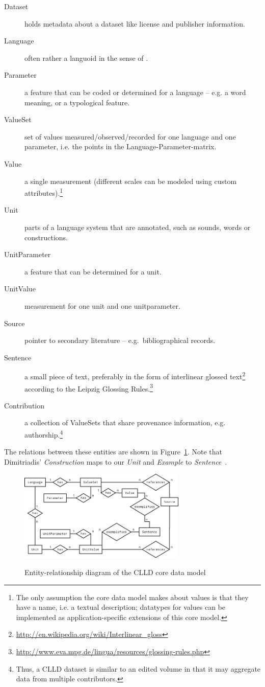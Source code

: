 \documentclass[a4paper,10pt]{article}
\begin{document}
\begin{description}
\item[Dataset] holds metadata about a dataset like license and publisher information.
\item[Language] often rather a languoid in the sense of .
\item[Parameter] a feature that can be coded or determined for a language
-- e.g. a word meaning, or a typological feature.
\item[ValueSet] set of values measured/observed/recorded for one language and one parameter,
i.e. the points in the Language-Parameter-matrix.
\item[Value] a single measurement (different scales can be modeled using custom attributes).\footnote{The only assumption
the core data model makes about values is that they have a name, i.e. a textual description;
datatypes for values can be implemented as application-specific extensions of this core model.}
\item[Unit] parts of a language system that are annotated, such as sounds, words or constructions.
\item[UnitParameter] a feature that can be determined for a unit.
\item[UnitValue] measurement for one unit and one unitparameter.
\item[Source] pointer to secondary literature -- e.g.~bibliographical records.
\item[Sentence] a small piece of text, preferably in the form of interlinear glossed
text\footnote{\url{http://en.wikipedia.org/wiki/Interlinear\_gloss}} according to the
Leipzig Glossing Rules.\footnote{\url{http://www.eva.mpg.de/lingua/resources/glossing-rules.php}}
\item[Contribution] a collection of ValueSets that share provenance information, e.g. authorship.\footnote{Thus,
a CLLD dataset is similar to an edited volume in that it may aggregate data from multiple contributors.}
\end{description}

The relations between these entities are shown in Figure~\ref{cllddatamodel}. Note that
Dimitriadis' \emph{Construction} maps to our \emph{Unit} and \emph{Example} to \emph{Sentence}~\cite[p.~15]{burs}.

\begin{figure}[h!]
  \caption{Entity-relationship diagram of the CLLD core data model}
  \centering
\includegraphics[width=8cm]{clld_erd.png}
\label{cllddatamodel}
\end{figure}
\end{document}
